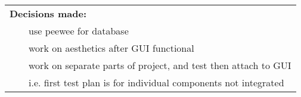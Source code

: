 \documentclass{article}
\newcommand{\tabitem}{~~\llap{\textbullet}~~}
\begin{document}
\begin{tabularx}{\textwidth}{| X || X || X || X |}
    \hline

    \multicolumn{4}{|l|}{\textbf{Decisions made:}}\\
    
    \multicolumn{4}{|l|}{\tabitem use peewee for database}\\
    \multicolumn{4}{|l|}{\tabitem work on aesthetics after GUI functional}\\
    \multicolumn{4}{|l|}{\tabitem work on separate parts of project, and test then attach to GUI}\\
        \multicolumn{4}{|l|}{\quad\tabitem i.e. first test plan is for individual components not integrated}\\

    \hline

\end{tabularx}
\end{document}
